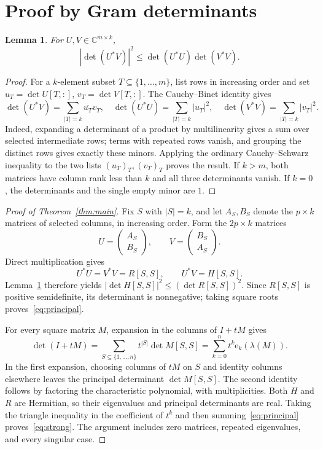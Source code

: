 \documentclass[11pt]{article}
\newtheorem{lemma}[theorem]{Lemma}
\newcommand{\CC}{\mathbb C}
\newcommand{\ee}{\mathrm e}
\newcommand{\Id}{I}
\begin{document}
\section{Proof by Gram determinants}
\begin{lemma}\label{lem:gram}
For $U,V\in\CC^{m\times k}$,
\[
 |\det(U^*V)|^2\leq\det(U^*U)\det(V^*V).
\]
\end{lemma}
\begin{proof}
For a $k$-element subset $T\subseteq\{1,\ldots,m\}$, list rows in increasing
order and set $u_T=\det U[T,:]$, $v_T=\det V[T,:]$.
The Cauchy--Binet identity gives
\[
 \det(U^*V)=\sum_{|T|=k}\overline{u_T}v_T,\quad
 \det(U^*U)=\sum_{|T|=k}|u_T|^2,\quad
 \det(V^*V)=\sum_{|T|=k}|v_T|^2.
\]
Indeed, expanding a determinant of a product by multilinearity gives a sum
over selected intermediate rows; terms with repeated rows vanish, and grouping
the distinct rows gives exactly these minors. Applying the ordinary
Cauchy--Schwarz inequality to the two lists $(u_T)_T,(v_T)_T$ proves the result.
If $k>m$, both matrices have column rank less than $k$ and all three determinants
vanish. If $k=0$, the determinants and the single empty minor are $1$.
\end{proof}

\begin{proof}[Proof of Theorem~\ref{thm:main}]
Fix $S$ with $|S|=k$, and let $A_S,B_S$ denote the $p\times k$ matrices of
selected columns, in increasing order. Form the $2p\times k$ matrices
\[
 U=\begin{pmatrix}A_S\\B_S\end{pmatrix},\qquad
 V=\begin{pmatrix}B_S\\A_S\end{pmatrix}.
\]
Direct multiplication gives
\[
 U^*U=V^*V=R[S,S],\qquad U^*V=H[S,S].
\]
Lemma~\ref{lem:gram} therefore yields
$|\det H[S,S]|^2\leq(\det R[S,S])^2$.
Since $R[S,S]$ is positive semidefinite, its determinant is nonnegative;
taking square roots proves~\eqref{eq:principal}.

For every square matrix $M$, expansion in the columns of $\Id+tM$ gives
\begin{equation}\label{eq:coeff}
 \det(\Id+tM)=\sum_{S\subseteq\{1,\ldots,n\}}t^{|S|}\det M[S,S]
 =\sum_{k=0}^n t^k\ee_k(\lambda(M)).
\end{equation}
In the first expansion, choosing columns of $tM$ on $S$ and identity columns
elsewhere leaves the principal determinant $\det M[S,S]$.
The second identity follows by factoring the characteristic polynomial,
with multiplicities. Both $H$ and $R$ are Hermitian, so their eigenvalues
and principal determinants are real. Taking the triangle inequality in the
coefficient of $t^k$ and then summing~\eqref{eq:principal} proves~\eqref{eq:strong}.
The argument includes zero matrices, repeated eigenvalues, and every singular case.
\end{proof}
\end{document}
